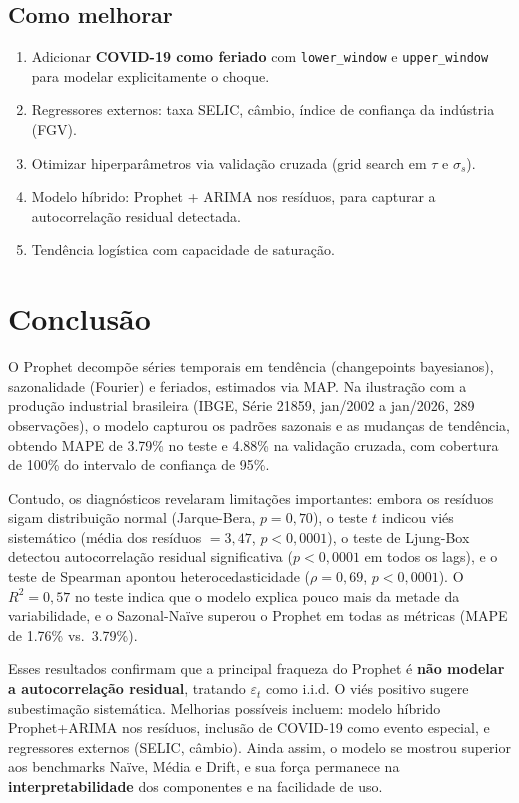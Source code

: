 \documentclass[12pt, a4paper]{article}
\begin{document}
\subsection{Como melhorar}
\begin{enumerate}[nosep, leftmargin=*]
    \item Adicionar \textbf{COVID-19 como feriado} com
    \texttt{lower\_window} e \texttt{upper\_window} para
    modelar explicitamente o choque.
    \item Regressores externos: taxa SELIC, câmbio, índice de
    confiança da indústria (FGV).
    \item Otimizar hiperparâmetros via validação cruzada
    (grid search em $\tau$ e $\sigma_s$).
    \item Modelo híbrido: Prophet + ARIMA nos resíduos, para
    capturar a autocorrelação residual detectada.
    \item Tendência logística com capacidade de saturação.
\end{enumerate}

\section{Conclusão}

O Prophet decompõe séries temporais em tendência (changepoints
bayesianos), sazonalidade (Fourier) e feriados, estimados via MAP.
Na ilustração com a produção industrial brasileira (IBGE, Série
21859, jan/2002 a jan/2026, 289 observações), o modelo capturou
os padrões sazonais e as mudanças de tendência, obtendo MAPE de
3.79\% no teste e 4.88\% na validação cruzada, com cobertura de
100\% do intervalo de confiança de 95\%.

Contudo, os diagnósticos revelaram limitações importantes: embora
os resíduos sigam distribuição normal (Jarque-Bera, $p = 0{,}70$),
o teste $t$ indicou viés sistemático (média dos resíduos $= 3{,}47$,
$p < 0{,}0001$), o teste de Ljung-Box detectou autocorrelação
residual significativa ($p < 0{,}0001$ em todos os lags), e o teste
de Spearman apontou heterocedasticidade ($\rho = 0{,}69$,
$p < 0{,}0001$). O $R^2 = 0{,}57$ no teste indica que o modelo
explica pouco mais da metade da variabilidade, e o Sazonal-Naïve
superou o Prophet em todas as métricas (MAPE de 1.76\% vs.\ 3.79\%).

Esses resultados confirmam que a principal fraqueza do Prophet é
\textbf{não modelar a autocorrelação residual}, tratando
$\varepsilon_t$ como i.i.d. O viés positivo sugere subestimação
sistemática. Melhorias possíveis incluem: modelo híbrido
Prophet+ARIMA nos resíduos, inclusão de COVID-19 como evento
especial, e regressores externos (SELIC, câmbio). Ainda assim,
o modelo se mostrou superior aos benchmarks Naïve, Média e Drift,
e sua força permanece na \textbf{interpretabilidade} dos
componentes e na facilidade de uso.
\end{document}
